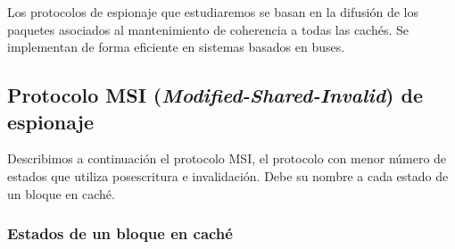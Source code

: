 Los protocolos de espionaje que estudiaremos se basan en la difusión de los paquetes asociados al mantenimiento de coherencia a todas las cachés. Se implementan de forma eficiente en sistemas basados en buses.

\subsection{Protocolo MSI (\emph{Modified-Shared-Invalid}) de espionaje}
Describimos a continuación el protocolo MSI, el protocolo con menor número de estados que utiliza posescritura e invalidación. Debe su nombre a cada estado de un bloque en caché.

\subsubsection{Estados de un bloque en caché}\label{sec:prot_MSI}
